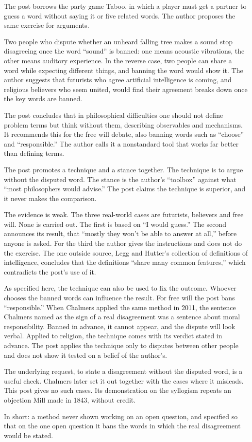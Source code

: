 \begin{afterword}
\summaryhead

The post borrows the party game Taboo, in which a player must get a partner to guess a word without saying it or five related words. The author proposes the same exercise for arguments.

Two people who dispute whether an unheard falling tree makes a sound stop disagreeing once the word ``sound'' is banned: one means acoustic vibrations, the other means auditory experience. In the reverse case, two people can share a word while expecting different things, and banning the word would show it. The author suggests that futurists who agree artificial intelligence is coming, and religious believers who seem united, would find their agreement breaks down once the key words are banned.

The post concludes that in philosophical difficulties one should not define problem terms but think without them, describing observables and mechanisms. It recommends this for the free will debate, also banning words such as ``choose'' and ``responsible.'' The author calls it a nonstandard tool that works far better than defining terms.

\responsehead

The post promotes a technique and a stance together. The technique is to argue without the disputed word. The stance is the author's ``toolbox'' against what ``most philosophers would advise.'' The post claims the technique is superior, and it never makes the comparison.

The evidence is weak. The three real-world cases are futurists, believers and free will. None is carried out. The first is based on ``I would guess.'' The second announces its result, that ``mostly they won't be able to answer at all,'' before anyone is asked. For the third the author gives the instructions and does not do the exercise. The one outside source, Legg and Hutter's collection of definitions of intelligence, concludes that the definitions ``share many common features,'' which contradicts the post's use of it.

As specified here, the technique can also be used to fix the outcome. Whoever chooses the banned words can influence the result. For free will the post bans ``responsible.'' When Chalmers applied the same method in 2011, the sentence Chalmers named as the sign of a real disagreement was a sentence about moral responsibility. Banned in advance, it cannot appear, and the dispute will look verbal. Applied to religion, the technique comes with its verdict stated in advance. The post applies the technique only to disputes between other people and does not show it tested on a belief of the author's.

The underlying request, to state a disagreement without the disputed word, is a useful check. Chalmers later set it out together with the cases where it misleads. This post gives no such cases. Its demonstration on the syllogism repeats an objection Mill made in 1843, without credit.

In short: a method never shown working on an open question, and specified so that on the one open question it bans the words in which the real disagreement would be stated.
\end{afterword}
